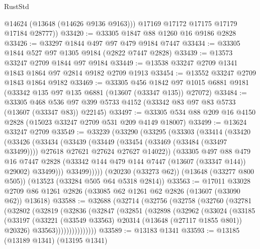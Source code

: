 \begin{lexlean}{RustStd}
\begin{coremodule}
          @14624
          (@13648 (@14626 @9136 @9163)))
        @17169
        @17172
        @17175
        @17179
        @17184
        @28777))
@33420 := @33305 @1847 @88 @1260 @16 @9186 @2828
@33426 := @33297 @1844 @497 @97 @479 @9184 @7447
@33434 := @33305 @1844 @527 @97 @1305 @9184 (@2822 @7447 @2828)
@33439 := @13573 @33247 @2709 @1844 @97 @9184
@33449 := @13538 @33247 @2709 @1341 @1843 @1864 @97 @2814 @9182 @2709 @1913
@33454 := @13552 @33247 @2709 @1843 @1864 @9182
@33469 := @33305
    @456
    @1842
    @97
    @1015
    @6881
    @9181
    (@33342 @135 @97 @135 @6881 (@13607 (@33347 @135)) @27072)
@33484 := @33305
    @468
    @536
    @97
    @399
    @5733
    @4152
    (@33342 @83 @97 @83 @5733 (@13607 (@33347 @83)) @22145)
@33497 := @33305 @534 @88 @209 @16 @4150 @2828 (@15023 @33247 @2709 @531 @209 @4149 @18007)
@33499 := @13624 @33247 @2709
@33549 := @33239
    (@33290
      (@33295
        (@33303
          (@33414
            (@33420
              (@33426
                (@33434
                  (@33439
                    (@33449
                      (@33454 (@33469 (@33484 (@33497 @33499))))
                      @27618
                      @27621
                      @27624
                      @27627
                      @14022))
                  (@33305
                    @497
                    @88
                    @479
                    @16
                    @7447
                    @2828
                    (@33342 @144 @479 @144 @7447 (@13607 (@33347 @144)) @29002)
                    @33499)))
              @33499)))))
    (@20230 (@33273 @62))
    (@13648 (@33277 @800 @505))
    (@13523 (@33284 @505 @64 @5318 @2814))
@33563 := @17011
    @33028
    @2709
    @86
    @1261
    @2826
    (@33085 @62 @1261 @62 @2826 (@13607 (@33090 @62)) @13618)
@33588 := @32688
    (@32714
      (@32756
        (@32758
          (@32760
            (@32781
              (@32802
                (@32819
                  (@32836
                    (@32847
                      (@32851
                        (@32898
                          (@32962
                            (@33024
                              (@33185
                                (@33197
                                  (@33221
                                    (@33549 @33563)
                                    @20314
                                    (@13648 (@27117 @1855 @801))
                                    @20326)
                                  @33563)))))))))))))))
@33589 := @13183 @1341
@33593 := @13185 (@13189 @1341) (@13195 @1341)

\end{coremodule}
\end{lexlean}
